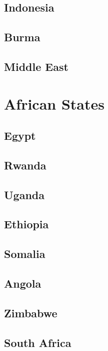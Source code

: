 \subsection*{Indonesia}

\subsection*{Burma}

\subsection*{Middle East}

\section{African States}

\subsection*{Egypt}

\subsection*{Rwanda}

\subsection*{Uganda}

\subsection*{Ethiopia}

\subsection*{Somalia}

\subsection*{Angola}

\subsection*{Zimbabwe}

\subsection*{South Africa}
